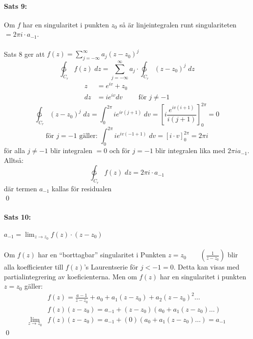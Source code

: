 \documentclass{article}
\begin{document}
\paragraph{Sats 9:}
Om $f$ har en singularitet i punkten $z_0$ så är linjeintegralen runt singulariteten $= 2 \pi i \cdot a_{-1}$.\\
\\
Sats 8 ger att $f(z) = \sum\limits_{j = - \infty}^\infty a_j (z - z_0)^j$
\[
	\ointctrclockwise_{C_r} f(z) \; dz = \sum_{j = - \infty}^\infty a_j \cdot \ointctrclockwise_{C_r} (z - z_0)^j \; dz
\]
\begin{align*}
	z &= e^{iv} + z_0 \\
	dz &= ie^{iv} dv \qquad \text{ för } j \neq - 1
\end{align*}
\[
	\ointctrclockwise_{C_r} (z - z_0)^j \; dz = \int_0^{2 \pi} ie^{ir(j + 1)} \; dv =
	\left [
		i \frac {e^{iv(i + 1)}} {i (j + 1)}
	\right ]_0^{2 \pi}
	= 0
\]
\[
	\text{för } j = -1 \text{ gäller: } \int_0^{2\pi} ie^{iv(-1 + 1)} \; dv = 
	\left [
		i \cdot v
	\right ]_0^{2\pi}
	= 2 \pi i
\]
för alla $j \neq -1$ blir integralen $ = 0$ och för $j = -1$ blir integralen lika med $2 \pi i a_{- 1}$.
Alltså:
\[
	\ointctrclockwise_{C_r} f(z) \; dz = 2 \pi i \cdot a_{-1}
\]
där termen $a_{-1}$ kallas för residualen \\
\hfill \qed

\paragraph{Sats 10:} $a_{-1} = \lim_{z \to z_0} f(z) \cdot (z - z_0)$\\
\\
Om $f(z)$ har en ``borttagbar'' singularitet i Punkten $z = z_0 \qquad \left ( \frac {1} {z - z_0} \right )$ blir 
alla koefficienter till $f(z)$'s Laurentserie för $j < -1 = 0$. Detta kan visas med partialintegrering av koeficienterna.
Men om $f(z)$ har en singularitet i punkten $z = z_0$ gäller:
\begin{align*}
	&f(z) = \frac {a - 1} {z - z_0} + a_0 + a_1(z - z_0) + a_2(z - z_0)^2 \ldots \\
	&f(z) (z - z_0) = a_{-1} + (z - z_0)(a_0 + a_1 (z - z_0) \ldots ) \\
	\lim_{z \to z_0} &f(z)(z - z_0) = a_{- 1} + (0)(a_0 + a_1(z - z_0) \ldots ) = a_{-1}
\end{align*}
\hfill \qed
\\
\end{document}
